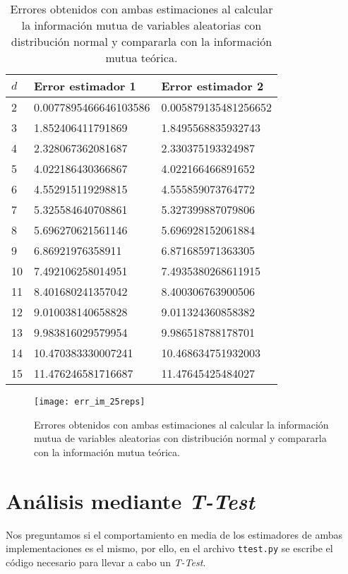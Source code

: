 \documentclass[12pt,a4paper]{report} %
\theoremstyle{definition}
\begin{document}
\begin{table}[H]
\centering
\caption{Errores obtenidos con ambas estimaciones al calcular la información mutua de variables aleatorias con distribución normal y compararla con la información mutua teórica.}
\label{tab:err_im}
\begin{tabular}{lll}
\toprule
$d$ & Error estimador 1 & Error estimador 2\\ \midrule
2 & 0.0077895466646103586 & 0.005879135481256652\\
3 & 1.852406411791869 & 1.8495568835932743\\
4 & 2.328067362081687 & 2.330375193324987\\
5 & 4.022186430366867 & 4.022166466891652\\
6 & 4.552915119298815 & 4.555859073764772\\
7 & 5.325584640708861 & 5.327399887079806\\
8 & 5.696270621561146 & 5.696928152061884\\
9 & 6.86921976358911 & 6.871685971363305\\
10 & 7.492106258014951 & 7.4935380268611915\\
11 & 8.401680241357042 & 8.400306763900506\\
12 & 9.010038140658828 & 9.011324360858382\\
13 & 9.983816029579954 & 9.986518788178701\\
14 & 10.470383330007241 & 10.468634751932003\\
15 & 11.476246581716687 & 11.47645425484027\\
\bottomrule
\end{tabular}
\end{table}

\begin{figure}[H]
    \centering
    \texttt{[image: err\_im\_25reps]}
    \caption{Errores obtenidos con ambas estimaciones al calcular la información mutua de variables aleatorias con distribución normal y compararla con la información mutua teórica.}
    \label{fig:err_im}
\end{figure}

\section{Análisis mediante \textit{T-Test}}

Nos preguntamos si el comportamiento en media de los estimadores de ambas implementaciones es el mismo, por ello, en el archivo \texttt{ttest.py} se escribe el código necesario para llevar a cabo un \textit{T-Test}.\\
\end{document}
